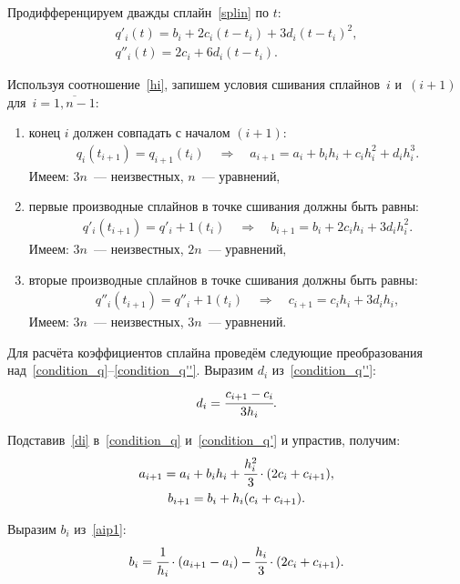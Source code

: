 Продифференцируем дважды сплайн~\eqref{splin} по $ t $:
\begin{gather}
	q'_i(t) = b_i + 2 c_i (t-t_i) + 3 d_i (t-t_i)^2, \\
	q''_i(t) = 2 c_i + 6 d_i (t-t_i).
\end{gather}

Используя соотношение~\eqref{hi}, запишем условия сшивания сплайнов~$ i $ и~$ (i+1) $ для~$ i = \overline{1,n-1} $:
\begin{enumerate}
	\item конец $ i $ должен совпадать с началом $ (i+1) $:
	\begin{gather}\label{condition_q}
		q_i(t_{i+1}) = q_{i+1}(t_i)
		\quad \Rightarrow \quad
		a_{i+1} = a_{i} + b_i h_i + c_i h_i^2 + d_i h_i^3.
	\end{gather}
	Имеем: $ 3n $~--- неизвестных, $ n $~--- уравнений,
	\item первые производные сплайнов в точке сшивания должны быть равны:
	\begin{gather}\label{condition_q'}
		q'_i(t_{i+1}) = q'_i+1(t_i)
		\quad \Rightarrow \quad
		b_{i+1} = b_i + 2 c_i h_i + 3 d_i h_i^2.
	\end{gather}
	Имеем: $ 3n $~--- неизвестных, $ 2n $~--- уравнений,
	\item вторые производные сплайнов в точке сшивания должны быть равны:
	\begin{gather}\label{condition_q''}
		q''_i(t_{i+1}) = q''_i+1(t_i)
		\quad \Rightarrow \quad
		c_{i+1} = c_i h_i + 3 d_i h_i,
	\end{gather}
	Имеем: $ 3n $~--- неизвестных, $ 3n $~--- уравнений.
\end{enumerate}

Для расчёта коэффициентов сплайна проведём следующие преобразования над~\eqref{condition_q}--\eqref{condition_q''}. Выразим $ d_i $ из~\eqref{condition_q''}:
\begin{equation}\label{di}
	d_i = \cfrac{c_{i+1} - c_i}{3 h_i}.
\end{equation}

Подставив~\eqref{di} в~\eqref{condition_q} и~\eqref{condition_q'} и упрастив, получим:
\begin{gather}\label{aip1}
	a_{i+1} = a_i + b_i h_i + \cfrac{h_i^2}{3} \cdot ( 2 c_i + c_{i+1} ), \\
	\label{bip1}
	b_{i+1} = b_i + h_i ( c_i + c_{i+1} ).
\end{gather}

Выразим $ b_i $ из~\eqref{aip1}:
\begin{equation}\label{bi}
	b_i = \cfrac{1}{h_i} \cdot ( a_{i+1} - a_{i} ) - \cfrac{h_i}{3} \cdot ( 2 c_i + c_{i+1} ).
\end{equation}

